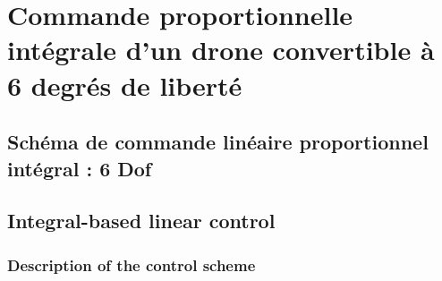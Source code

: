 \chapter{Commande proportionnelle intégrale d'un drone convertible à 6 degrés de liberté}
\minitoc

\section{Schéma de commande linéaire proportionnel intégral : 6 Dof}
\section{Integral-based linear control}
\label{sec:6dofcmd}
\subsection{Description of the control scheme}
\label{sec:ctl_sche}

